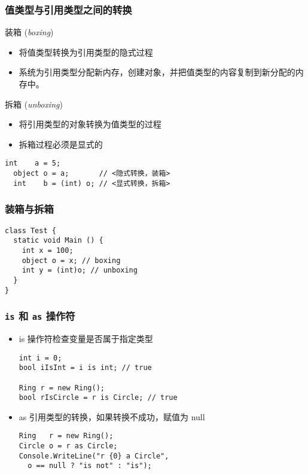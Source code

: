 \begin{frame}[fragile]
\frametitle{值类型与引用类型之间的转换}
\begin{block}{装箱 (\textit{boxing})}
  \begin{itemize}
  \item 将值类型转换为引用类型的隐式过程
  \item 系统为引用类型分配新内存，创建对象，并把值类型的内容复制到新分配的内存中。
  \end{itemize}
\end{block}
\begin{block}{拆箱 (\textit{unboxing})}
  \begin{itemize}
  \item 将引用类型的对象转换为值类型的过程
  \item 拆箱过程必须是显式的
  \end{itemize}
\end{block}
\begin{lstlisting}[escapeinside=<>]
  int    a = 5;
  object o = a;       // <隐式转换，装箱>
  int    b = (int) o; // <显式转换，拆箱>

\end{lstlisting}
\end{frame}

\begin{frame}[fragile]
\frametitle{装箱与拆箱}

\begin{lstlisting}
class Test {
  static void Main () {
    int x = 100;
    object o = x; // boxing
    int y = (int)o; // unboxing
  }
}

\end{lstlisting}
  \begin{figure}[htbp]
    \centering
    
  \end{figure}

\end{frame}

\begin{frame}[fragile]
\frametitle{\texttt{is} 和 \texttt{as} 操作符}
\begin{itemize}
\item is 操作符检查变量是否属于指定类型
\begin{lstlisting}
int i = 0;
bool iIsInt = i is int; // true

Ring r = new Ring();
bool rIsCircle = r is Circle; // true
\end{lstlisting}
\item as 引用类型的转换，如果转换不成功，赋值为 null
\begin{lstlisting}
Ring   r = new Ring();
Circle o = r as Circle;
Console.WriteLine("r {0} a Circle",
  o == null ? "is not" : "is");
\end{lstlisting}
\end{itemize}
\end{frame}

